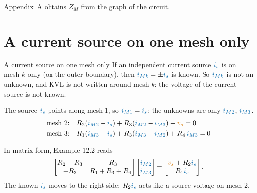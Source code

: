 \documentclass[11pt,a4paper]{article}
\newcommand{\Icol}[1]{\textcolor{ccur}{#1}}
\newcommand{\Vcol}[1]{\textcolor{cvolt}{#1}}
\newcommand{\im}[1]{\textcolor{ccur}{i_{M#1}}}
\newcommand{\meshcw}[4][0.36]{%
  \draw[ccur, thick, -{Stealth[length=2mm]}] ($(#2,#3)+(150:#1)$)
    arc[start angle=150, end angle=-150, radius=#1];
  \node[mlabst] at (#2,#3) {#4};}
\newcommand{\exM}[2]{%
  \ifnum#1=0
    \draw (0,2) to[american voltage source, l_=$\Vcol{v_{s1}}$] (0,0);
    \draw (7,0) to[american voltage source, l_=$\Vcol{v_{s2}}$] (7,2);
  \else
    \draw (0,0) to[american current source, l=$\Icol{i_s}$] (0,2);
    \draw (7,0) to[american voltage source, l_=$\Vcol{v_s}$] (7,2);
  \fi
  \draw (0,2) -- (0,3.5) to[R, l=$R_4$] (7,3.5) -- (7,2);
  \draw (0,2) to[R, l=$R_1$] (3.5,2) to[R, l=$R_3$] (7,2);
  \draw (3.5,2) to[R, l=$R_2$] (3.5,0);
  \draw (0,0) -- (7,0);
  \foreach \p in {(0,2),(3.5,2),(7,2),(3.5,0)} \fill \p circle (1.7pt);
  \ifnum#2>0
    \meshcw{1.6}{1.0}{1} \meshcw{5.5}{1.0}{2} \meshcw[0.33]{3.5}{2.8}{3}
  \fi}
\begin{document}
Appendix~A obtains $Z_M$ from the graph of the circuit.

\section{A current source on one mesh only}

\begin{definitionbox}{A current source on one mesh only}
If an independent current source $\Icol{i_s}$ is on mesh $k$ only (on the outer boundary), then
$\im{k} = \pm\Icol{i_s}$ is known. So $\im{k}$ is not an unknown, and KVL is not written around
mesh $k$: the voltage of the current source is not known.
\end{definitionbox}

\begin{examplebox}
\begin{minipage}[c]{0.37\linewidth}
\centering
{}
\end{minipage}\hfill
\begin{minipage}[c]{0.61\linewidth}
The source $\Icol{i_s}$ points along mesh 1, so $\im{1} = \Icol{i_s}$; the unknowns are only
$\im{2}$, $\im{3}$.
\begin{align*}
  \text{mesh 2:}\quad & R_2(\im{2} - \Icol{i_s}) + R_3(\im{2} - \im{3}) - \Vcol{v_s} = 0\\
  \text{mesh 3:}\quad & R_1(\im{3} - \Icol{i_s}) + R_3(\im{3} - \im{2}) + R_4\,\im{3} = 0
\end{align*}
\end{minipage}
\end{examplebox}
In matrix form, Example 12.2 reads
\[
  \begin{bmatrix} R_2 + R_3 & -R_3\\ -R_3 & R_1 + R_3 + R_4 \end{bmatrix}
  \begin{bmatrix} \im{2}\\ \im{3} \end{bmatrix}
  = \begin{bmatrix} \Vcol{v_s} + R_2\Icol{i_s}\\ R_1\Icol{i_s} \end{bmatrix} .
\]
The known $\Icol{i_s}$ moves to the right side: $R_2\Icol{i_s}$ acts like a source voltage on mesh 2.
\end{document}
